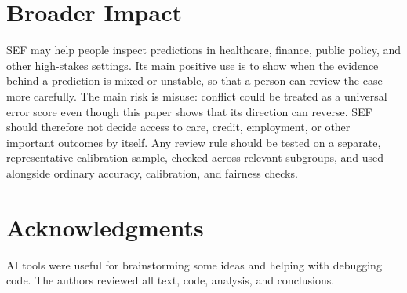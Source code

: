 \documentclass[11pt]{article}
\begin{document}
\section*{Broader Impact}

SEF may help people inspect predictions in healthcare, finance, public policy,
and other high-stakes settings. Its main positive use is to show when the
evidence behind a prediction is mixed or unstable, so that a person can review
the case more carefully. The main risk is misuse: conflict could be treated as
a universal error score even though this paper shows that its direction can
reverse. SEF should therefore not decide access to care, credit, employment, or
other important outcomes by itself. Any review rule should be tested on a
separate, representative calibration sample, checked across relevant
subgroups, and used alongside ordinary accuracy, calibration, and fairness
checks.

\section*{Acknowledgments}

AI tools were useful for brainstorming some ideas and helping with debugging code. The authors reviewed all text, code, analysis, and conclusions.



\end{document}

